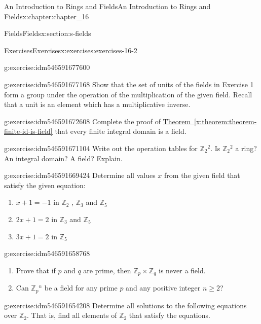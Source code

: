 \documentclass[oneside,10pt,]{book}
\newcommand{\xreffont}{\relax}
\numberwithin{equation}{section}
\begin{document}
\begin{chapterptx}{An Introduction to Rings and Fields}{}{An Introduction to Rings and Fields}{}{}{x:chapter:chapter_16}
\begin{sectionptx}{Fields}{}{Fields}{}{}{x:section:s-fields}
\begin{exercises-subsection}{Exercises}{}{Exercises}{}{}{x:exercises:exercises-16-2}
\begin{divisionexercise}{1}{}{}{g:exercise:idm546591677600}
\begin{enumerate}[label=(\alph*)]
\end{enumerate}
%
\end{divisionexercise}%
\begin{divisionexercise}{2}{}{}{g:exercise:idm546591677168}%
Show that the set of units of the fields in Exercise 1 form a group under the operation of the multiplication of the given field. Recall that a unit is an element which has a multiplicative inverse.%
\end{divisionexercise}%
\begin{divisionexercise}{3}{}{}{g:exercise:idm546591672608}%
Complete the proof of \hyperref[x:theorem:theorem-finite-id-is-field]{Theorem~{\xreffont\ref{x:theorem:theorem-finite-id-is-field}}} that every finite integral domain is a field.%
\end{divisionexercise}%
\begin{divisionexercise}{4}{}{}{g:exercise:idm546591671104}%
Write out the operation tables for \(\mathbb{Z}_2{}^2\).   Is \(\mathbb{Z}_2{}^2\) a ring? An integral domain? A field? Explain.%
\end{divisionexercise}%
\begin{divisionexercise}{5}{}{}{g:exercise:idm546591669424}%
Determine all values \(x\) from the given field that satisfy the given equation:%
\begin{enumerate}[label=(\alph*)]
\item{}\(x + 1 = -1\)  in \(\mathbb{Z}_2\) , \(\mathbb{Z}_3\) and \(\mathbb{Z}_5\)%
\item{}\(2x + 1 = 2\) in \(\mathbb{Z}_3\) and  \(\mathbb{Z}_5\)%
\item{}\(3x + 1 = 2\)  in \(\mathbb{Z}_5\)%
\end{enumerate}
%
\end{divisionexercise}%
\begin{divisionexercise}{6}{}{}{g:exercise:idm546591658768}%
%
\begin{enumerate}[label=(\alph*)]
\item{}Prove that if \(p\) and \(q\) are prime, then \(\mathbb{Z}_p \times  \mathbb{Z}_q\) is never a field.%
\item{}Can \(\mathbb{Z}_p{}^n\) be a field for any prime \(p\) and any positive integer \(n \geq  2\)?%
\end{enumerate}
%
\end{divisionexercise}%
\begin{divisionexercise}{7}{}{}{g:exercise:idm546591654208}%
Determine all solutions to the following equations over \(\mathbb{Z}_2\). That is, find all elements of \(\mathbb{Z}_2\) that satisfy the equations.%

\end{divisionexercise}
\end{exercises-subsection}
\end{sectionptx}
\end{chapterptx}
\end{document}
